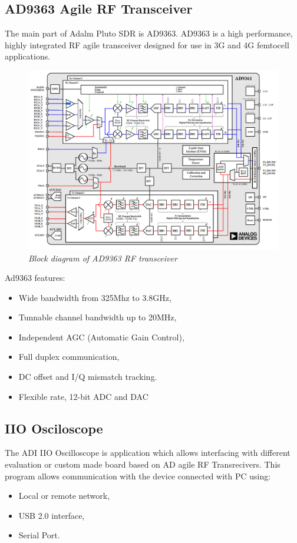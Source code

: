\documentclass[en,printmode]{mgr}
\begin{document}
		\subsection*{AD9363 Agile RF Transceiver}
			The main part of Adalm Pluto SDR is AD9363.  AD9363 is a high performance, highly
			integrated RF agile transceiver designed for use in 3G and 4G femtocell applications.
			
			\begin{figure}[!htb]
    			\centering
   				\includegraphics[width=\textwidth]{images/ad9361_sch.png}
   		 		\caption{\textit{Block diagram of AD9363 RF transceiver}}
			\end{figure}
			
			Ad9363 features:
			\begin{itemize}
				\item Wide bandwidth from 325Mhz to 3.8GHz,
				\item Tunnable channel bandwidth up to 20MHz,
				\item Independent AGC (Automatic Gain Control),
				\item Full duplex communication,
				\item DC offset and I/Q mismatch tracking.
				\item Flexible rate, 12-bit ADC and DAC
			\end{itemize}
		\subsection*{IIO Osciloscope}
			The ADI IIO Oscilloscope is application which allows interfacing with different
			evaluation or custom made board based on AD agile RF Transrecivers. This program allows
			communication with the device connected with PC
			using:
			\begin{itemize}
				\item Local or remote network,
				\item USB 2.0 interface,
				\item Serial Port.
			\end{itemize}			 
			
\end{document}
